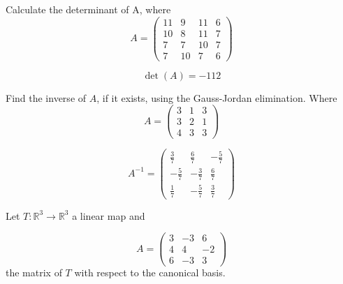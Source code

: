 \begin{questions}

\question Calculate the determinant of A, where
$$
A=\left(\begin{array}{rrrr}
11 & 9 & 11 & 6 \\
10 & 8 & 11 & 7 \\
7 & 7 & 10 & 7 \\
7 & 10 & 7 & 6
\end{array}\right)
$$

\begin{solution}
$$\det(A)=-112$$
\end{solution}

\question Find the inverse of $A$, if it exists, using the Gauss-Jordan elimination. Where
$$
A=\left(\begin{array}{rrr}
3 & 1 & 3 \\
3 & 2 & 1 \\
4 & 3 & 3
\end{array}\right)
$$

\begin{solution}
$$A^{-1}=\left(\begin{array}{rrr}
\frac{3}{7} & \frac{6}{7} & -\frac{5}{7} \\
-\frac{5}{7} & -\frac{3}{7} & \frac{6}{7} \\
\frac{1}{7} & -\frac{5}{7} & \frac{3}{7}
\end{array}\right)$$
\end{solution}

\question Let $T:\mathbb{R}^3\rightarrow\mathbb{R}^3$  a linear map and
 
$$
A=\left(\begin{array}{rrr}
3 & -3 & 6 \\
4 & 4 & -2 \\
6 & -3 & 3
\end{array}\right)
$$
the matrix of $T$ with respect to the canonical basis.
\end{questions}
